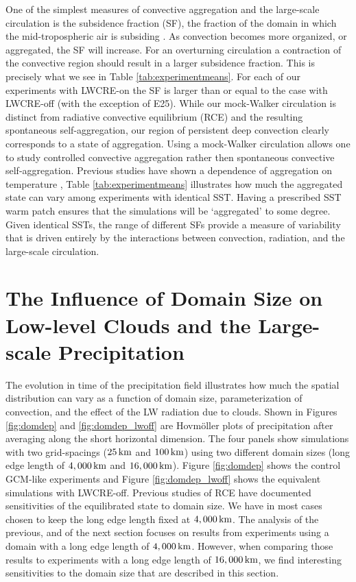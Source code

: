 \documentclass[draft]{agujournal2019}
\begin{document}
One of the simplest measures of convective aggregation and the large-scale circulation is the subsidence fraction (SF), the fraction of the domain 
in which the mid-tropospheric air is subsiding \cite{Coppin_Bony_2015}.  
As convection becomes more organized, or aggregated, the SF will increase.  For an overturning circulation a contraction of the convective 
region should result in a larger subsidence fraction.  
This is precisely what we see in Table \ref{tab:experimentmeans}.  For each of our experiments with LWCRE-on the SF is larger than 
or equal to the case with LWCRE-off (with the exception of E25).   
While our mock-Walker circulation is distinct from radiative convective equilibrium (RCE) and the resulting spontaneous self-aggregation, our 
region of persistent deep convection clearly corresponds to a state of aggregation. 
Using a mock-Walker circulation allows one to study controlled convective aggregation rather then spontaneous convective self-aggregation. 
Previous studies have shown a dependence of aggregation 
on temperature \cite{Khairoutdinov2010, Wing2014, Cronin2017}, Table \ref{tab:experimentmeans} illustrates how much the aggregated 
state can vary among experiments with identical SST.  Having a prescribed SST warm 
patch ensures that the simulations will be `aggregated' to some degree.  
Given identical SSTs, the  range of different SFs provide a measure of variability that is driven entirely by the interactions between 
convection, radiation, and the large-scale circulation. 


\section{The Influence of Domain Size on Low-level Clouds and the Large-scale Precipitation}


The evolution in time of the precipitation field illustrates how much the spatial distribution can vary as a 
function of domain size, parameterization of convection, and the effect of the LW radiation due to clouds. 
Shown in Figures {\ref{fig:domdep}} and {\ref{fig:domdep_lwoff}} are Hovm{\"o}ller plots of precipitation after 
averaging along the short horizontal dimension.  The four panels show simulations with two grid-spacings 
($25\, \rm{km}$ and $100\, \rm{km}$) using two different domain sizes (long edge length of $4,000\, \rm{km}$ and $16,000\, \rm{km}$).
Figure {\ref{fig:domdep}} shows the control GCM-like experiments and Figure  {\ref{fig:domdep_lwoff}} shows the equivalent simulations with LWCRE-off.    
 Previous studies of RCE
\cite{Bretherton_etal_2005, Bretherton_etal_2006, Muller2012, Jeevanjee2013, Silvers_etal_2016, Dixit_etal_2018, Patrizio_Randall_2019}
have documented sensitivities of the equilibrated state to domain size.  
We have in most cases chosen to keep the long edge length fixed at $4,000\, \rm{km}$. 
The analysis of the previous, and of the next section focuses on results from 
experiments using a domain with a long edge length of $4,000 \, \rm{km}$.  However, when comparing those results
to experiments with a long edge length of $16,000 \, \rm{km}$, we find interesting sensitivities to the domain size that are described in this section. 
\end{document}

